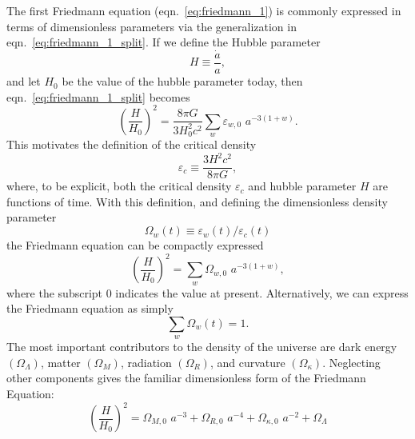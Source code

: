 The first Friedmann equation (eqn.~\ref{eq:friedmann_1}) is commonly expressed
in terms of dimensionless parameters via the generalization in
eqn.~\ref{eq:friedmann_1_split}.  If we define the Hubble parameter
\begin{equation}
  \label{eq:hubble_parameter}
  H \equiv \frac{\dot{a}}{a},
\end{equation}
and let $H_0$ be the value of the hubble parameter today, then
eqn.~\ref{eq:friedmann_1_split} becomes
\begin{equation}
  \left(\frac{H}{H_0}\right)^2 = \frac{8\pi G}{3H_0^2c^2}
  \sum_w \varepsilon_{w, 0} \,\, a^{-3(1 + w)}.
\end{equation}
This motivates the definition of the critical density
\begin{equation}
  \label{eq:critical_density}
  \varepsilon_c \equiv \frac{3 H^2 c^2}{8\pi G},
\end{equation}
where, to be explicit, both the critical density $\varepsilon_c$ and
hubble parameter $H$ are functions of time.  With this definition,
and defining the dimensionless density parameter
\begin{equation}
  \label{eq:density_parameter}
  \Omega_w(t) \equiv \varepsilon_w(t) / \varepsilon_c(t)
\end{equation}
the Friedmann equation can be compactly expressed
\begin{equation}
  \left(\frac{H}{H_0}\right)^2
  = \sum_w \Omega_{w, 0}\,\, a^{-3(1 + w)},
\end{equation}
where the subscript $0$ indicates the value at present.
Alternatively, we can express the Friedmann equation as simply
\begin{equation}
  \sum_w \Omega_w(t) = 1.
\end{equation}
The most important contributors to the density of the universe are
dark energy $(\Omega_\Lambda)$, matter $(\Omega_M)$, radiation $(\Omega_R)$,
and curvature $(\Omega_\kappa)$.  Neglecting other components gives the
familiar dimensionless form of the Friedmann Equation:
\begin{equation}
  \label{eq:friedmann_dimensionless}
  \left(\frac{H}{H_0}\right)^2
  = \Omega_{M,0}\,\,a^{-3} + \Omega_{R,0}\,\,a^{-4}
  + \Omega_{\kappa,0}\,\,a^{-2} + \Omega_\Lambda
\end{equation}


